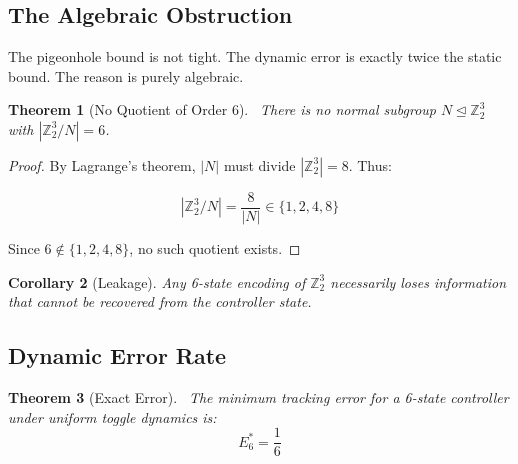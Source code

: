 \documentclass[11pt]{article}
\newtheorem{theorem}{Theorem}[section]
\newtheorem{corollary}[theorem]{Corollary}
\begin{document}
\subsection{The Algebraic Obstruction}

The pigeonhole bound is not tight. The dynamic error is exactly twice the static bound. The reason is purely algebraic.

\begin{theorem}[No Quotient of Order 6]~\label{thm:quotient}
There is no normal subgroup $N \trianglelefteq \mathbb{Z}_2^3$ with $|\mathbb{Z}_2^3 / N| = 6$.
\end{theorem}

\begin{proof}
By Lagrange's theorem, $|N|$ must divide $|\mathbb{Z}_2^3| = 8$. Thus:

$$|\mathbb{Z}_2^3 / N| = \frac{8}{|N|} \in \{1, 2, 4, 8\}$$

Since $6 \notin \{1, 2, 4, 8\}$, no such quotient exists.
\end{proof}

\begin{corollary}[Leakage]
Any 6-state encoding of $\mathbb{Z}_2^3$ necessarily loses information that cannot be recovered from the controller state.
\end{corollary}

\subsection{Dynamic Error Rate}

\begin{theorem}[Exact Error]~\label{thm:exact}
The minimum tracking error for a 6-state controller under uniform toggle dynamics is:
$$\boxed{E_6^* = \frac{1}{6}}$$
\end{theorem}
\end{document}
